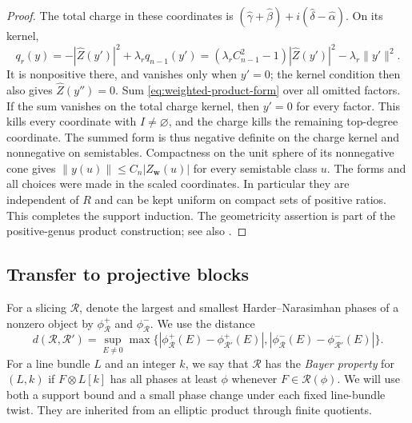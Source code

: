 \begin{proof}
The total charge in these coordinates is
$(\widehat\gamma+\widehat\beta)
+i(\widehat\delta-\widehat\alpha)$.  On its kernel,
\[
 q_r(y)=-|\widehat Z(y')|^2+\lambda_rq_{n-1}(y')
       =(\lambda_rC_{n-1}^2-1)|\widehat Z(y')|^2
           -\lambda_r\|y'\|^2.
\]
It is nonpositive there, and vanishes only when $y'=0$; the kernel
condition then also gives $\widehat Z(y'')=0$.
Sum \eqref{eq:weighted-product-form} over all omitted factors.  If the
sum vanishes on the total charge kernel, then $y'=0$ for every factor.
This kills every coordinate with $I\ne\varnothing$, and the charge
kills the remaining top-degree coordinate.  The summed form is thus
negative definite on the charge kernel and nonnegative on semistables.
Compactness on the unit sphere of its nonnegative cone gives
$\|y(u)\|\le C_n|Z_{\mathbf w}(u)|$ for every semistable class $u$.
The forms and all choices were made in the scaled coordinates.  In
particular they are independent of $R$ and can be kept uniform on
compact sets of positive ratios.  This completes the support induction.
The geometricity assertion is part of the positive-genus product
construction; see also \cite[Theorem~4.1(1)]{LiEtAl2026}.
\end{proof}

\subsection{Transfer to projective blocks}

For a slicing $\mathcal R$, denote the largest and smallest
Harder--Narasimhan phases of a nonzero object by $\phi^+_{\mathcal R}$ and
$\phi^-_{\mathcal R}$.  We use the distance
\[
 d(\mathcal R,\mathcal R')=
 \sup_{E\ne0}\max\{
 |\phi^+_{\mathcal R}(E)-\phi^+_{\mathcal R'}(E)|,
 |\phi^-_{\mathcal R}(E)-\phi^-_{\mathcal R'}(E)|\}.
\]
For a line bundle $L$ and an integer $k$, we say that $\mathcal R$ has
the \emph{Bayer property} for $(L,k)$ if $F\otimes L[k]$ has all phases
at least $\phi$ whenever $F\in\mathcal R(\phi)$.
We will use both a support bound and a small phase change under each
fixed line-bundle twist.  They are inherited from an elliptic product
through finite quotients.

